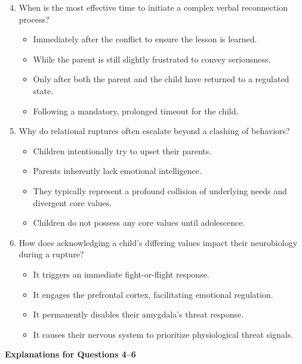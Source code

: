 \begin{practiceexercise}
\begin{enumerate}
  \setcounter{enumi}{3}
  \item When is the most effective time to initiate a complex verbal reconnection process?
    \begin{itemize}
      \item[A)] Immediately after the conflict to ensure the lesson is learned.
      \item[B)] While the parent is still slightly frustrated to convey seriousness.
      \item[C)] Only after both the parent and the child have returned to a regulated state.
      \item[D)] Following a mandatory, prolonged timeout for the child.
    \end{itemize}
  \vspace{\fill}
  \item Why do relational ruptures often escalate beyond a clashing of behaviors?
    \begin{itemize}
      \item[A)] Children intentionally try to upset their parents.
      \item[B)] Parents inherently lack emotional intelligence.
      \item[C)] They typically represent a profound collision of underlying needs and divergent core values.
      \item[D)] Children do not possess any core values until adolescence.
    \end{itemize}
  \vspace{\fill}
  \item How does acknowledging a child's differing values impact their neurobiology during a rupture?
    \begin{itemize}
      \item[A)] It triggers an immediate fight-or-flight response.
      \item[B)] It engages the prefrontal cortex, facilitating emotional regulation.
      \item[C)] It permanently disables their amygdala's threat response.
      \item[D)] It causes their nervous system to prioritize physiological threat signals.
    \end{itemize}
\end{enumerate}
\vspace{\fill}
\newpage

\textbf{Explanations for Questions 4--6}


\end{practiceexercise}
